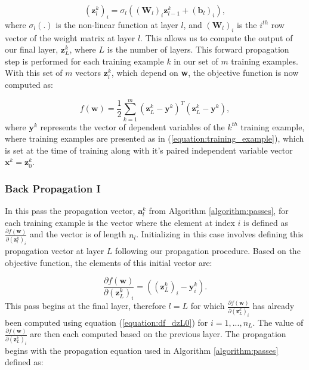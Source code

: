 \documentclass[letterpaper,12pt,titlepage,oneside,final]{book}
\begin{document}
	\begin{equation}
	(\mathbf{z}_{l}^{k})_{i} = \sigma_{l}((\mathbf{W}_{l})_{i}\mathbf{z}_{l-1}^{k} + (\mathbf{b}_{l})_{i}), 
	\label{equation:pass1_pe}
	\end{equation}
	where $\sigma_{l}(.)$ is the non-linear function at layer $l$, and $(\mathbf{W}_{l})_{i}$ is the $i^{th}$ row vector of the weight matrix at layer $l$. This allows us to compute the output of our final layer, $\mathbf{z}_{L}^{k}$, where $L$ is the number of layers. This forward propagation step is performed for each training example $k$ in our set of $m$ training examples. With this set of $m$ vectors $\mathbf{z}_{l}^{k}$, which depend on \textbf{w}, the objective function is now computed as:
	
	\begin{equation}
	f(\mathbf{w}) = \frac{1}{2}\sum_{k=1}^{m}{(\mathbf{z}_{L}^{k} - \mathbf{y}^{k})^{T}(\mathbf{z}_{L}^{k} - \mathbf{y}^{k})},
	\end{equation}
	where $\mathbf{y}^k$ represents the vector of dependent variables of the $k^{th}$ training example, where training examples are presented as in (\ref{equation:training_example}), which is set at the time of training along with it's paired independent variable vector $\mathbf{x}^{k} = \mathbf{z}^{k}_{0}$.
	
	\subsubsection{Back Propagation I}
	
	In this pass the propagation vector, $\mathbf{a}^{k}_{l}$ from Algorithm \ref{algorithm:passes}, for each training example is the vector where the element at index $i$ is defined as  $\frac{\partial{f(\mathbf{w})}}{\partial{(\mathbf{z}^{k}_{l})_{i}}}$ and the vector is of length $n_{l}$. Initializing in this case involves defining this propagation vector at layer $L$ following our propagation procedure. Based on the objective function, the elements of this initial vector are:
	
	\begin{equation}
	\frac{\partial{f(\mathbf{w})}}{\partial{(\mathbf{z}^{k}_{L})_{i}}} = ((\mathbf{z}_{L}^{k})_{i} - \mathbf{y}^{k}_{i}).
	\label{equation:df_dzL0}
	\end{equation}
	This pass begins at the final layer, therefore $l = L$ for which $\frac{\partial{f(\mathbf{w})}}{\partial{(\mathbf{z}^{k}_{L})_{i}}}$ has already been computed using equation (\ref{equation:df_dzL0}) for $i=1,...,n_{L}$. The value of $\frac{\partial{f(\mathbf{w})}}{\partial{(\mathbf{z}^{k}_{L})_{i}}}$ are then each computed based on the previous layer. The propagation begins with the propagation equation used in Algorithm \ref{algorithm:passes} defined as:
	
\end{document}
